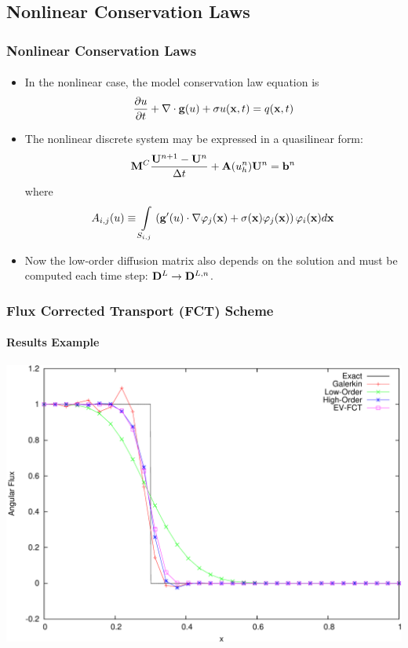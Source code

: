 \documentclass{beamer}
\begin{document}
\subsection{Nonlinear Conservation Laws}
\begin{frame}
\frametitle{Nonlinear Conservation Laws}
\framesubtitle{}

\begin{itemize}
   \item In the nonlinear case, the model conservation law equation is
      \begin{equation}
         \frac{\partial u}{\partial t} + \nabla\cdot\mathbf{g}(u) + \sigma u(\mathbf{x},t) = q(\mathbf{x},t)
      \end{equation}
   \item The nonlinear discrete system may be expressed in a quasilinear form:
      \begin{equation}
         \mathbf{M}^C\frac{\mathbf{U}^{n+1}-\mathbf{U}^n}{\Delta t} + \mathbf{A}(u_h^n)\mathbf{U}^n = \mathbf{b}^n
      \end{equation}
      where
      \begin{equation}
         A_{i,j}(u) \equiv \int\limits_{S_{i,j}}\left(
            \mathbf{g}'(u)\cdot\nabla\varphi_j(\mathbf{x}) +
            \sigma(\mathbf{x})\varphi_j(\mathbf{x})\right)\varphi_i(\mathbf{x}) d\mathbf{x}
      \end{equation}
   \item Now the low-order diffusion matrix also depends on the solution
      and must be computed each time step: $\mathbf{D}^L\rightarrow\mathbf{D}^{L,n}$.
\end{itemize}

\end{frame}
\begin{frame}
\frametitle{Flux Corrected Transport (FCT) Scheme}
\framesubtitle{Results Example}

\includegraphics[width=\textwidth]{./figures/advection_FCT.pdf}

\end{frame}
\end{document}
